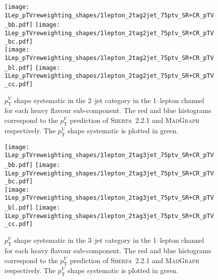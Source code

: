 \begin{figure}[ht]
  \centering
  \texttt{[image: 1Lep\_pTVreweighting\_shapes/1lepton\_2tag2jet\_75ptv\_SR+CR\_pTV\_bb.pdf]}
  \texttt{[image: 1Lep\_pTVreweighting\_shapes/1lepton\_2tag2jet\_75ptv\_SR+CR\_pTV\_bc.pdf]}
  \\
  \texttt{[image: 1Lep\_pTVreweighting\_shapes/1lepton\_2tag2jet\_75ptv\_SR+CR\_pTV\_bl.pdf]}
  \texttt{[image: 1Lep\_pTVreweighting\_shapes/1lepton\_2tag2jet\_75ptv\_SR+CR\_pTV\_cc.pdf]}
  \\
  \caption[Derivation of $p_{\mathrm{T}}^V$ shape uncertainties on $W+$jets events in the
  1--lepton channel (2--jet category).]{$p_{\mathrm{T}}^V$ shape systematic in the 2--jet
    category in the 1--lepton channel for each heavy flavour sub-component. The
    red and blue histograms correspond to the $p_{\mathrm{T}}^V$ prediction of
    \textsc{Sherpa}~2.2.1 and \textsc{MadGraph} respectively. The $p_{\mathrm{T}}^V$ shape
    systematic is plotted in green.}
  \label{fig:wjets_1lep_2jet_SysWPtVBDTr}
\end{figure}

\begin{figure}[ht!]
  \centering
  \texttt{[image: 1Lep\_pTVreweighting\_shapes/1lepton\_2tag3jet\_75ptv\_SR+CR\_pTV\_bb.pdf]}
  \texttt{[image: 1Lep\_pTVreweighting\_shapes/1lepton\_2tag3jet\_75ptv\_SR+CR\_pTV\_bc.pdf]}
  \\
  \texttt{[image: 1Lep\_pTVreweighting\_shapes/1lepton\_2tag3jet\_75ptv\_SR+CR\_pTV\_bl.pdf]}
  \texttt{[image: 1Lep\_pTVreweighting\_shapes/1lepton\_2tag3jet\_75ptv\_SR+CR\_pTV\_cc.pdf]}
  \\
  \caption[Derivation of $p_{\mathrm{T}}^V$ shape uncertainties on $W+$jets events in the
  1--lepton channel (3--jet category).]{$p_{\mathrm{T}}^V$ shape systematic in the 3--jet
    category in the 1--lepton channel for each heavy flavour sub-component. The
    red and blue histograms correspond to the $p_{\mathrm{T}}^V$ prediction of
    \textsc{Sherpa}~2.2.1 and \textsc{MadGraph} respectively. The $p_{\mathrm{T}}^V$ shape
    systematic is plotted in green.}
  \label{fig:wjets_1lep_3jet_SysWPtVBDTr}
\end{figure}
